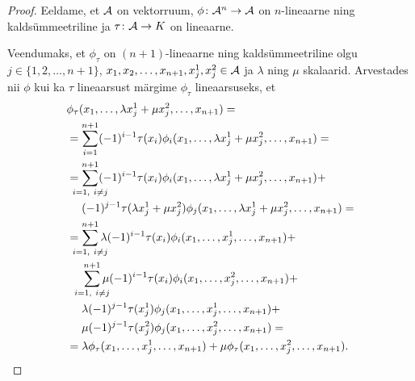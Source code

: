 \begin{proof}
    Eeldame, et $\mathcal{A}$ on vektorruum, $\phi \colon \mathcal{A}^n \to \mathcal{A}$ on
    $n$-lineaarne ning kaldsümmeetriline ja $\tau \colon \mathcal{A} \to K$
    on lineaarne.

    Veendumaks, et $\phi_\tau$ on $(n+1)$-lineaarne ning
    kaldsümmeetriline olgu $j \in \{1, 2, \dots, n+1\}$,
    $x_1, x_2, \dots, x_{n+1}, x_j^1, x_j^2 \in \mathcal{A}$ ja
    $\lambda$ ning $\mu$ skalaarid. Arvestades nii
    $\phi$ kui ka $\tau$ lineaarsust märgime $\phi_\tau$
    lineaarsuseks, et
    \begin{align*}
        &\phi_\tau(
            x_1, \dots, \lambda x_j^1 + \mu x_j^2, \dots, x_{n+1}
        ) = \\
        &= \sum_{i=1}^{n+1} (-1)^{i-1} \tau(x_i) \phi_i(
             x_1, \dots, \lambda x_j^1 + \mu x_j^2, \dots, x_{n+1}
           ) = \\
        &= \sum_{\mathclap{i=1,\ i \ne j}}^{n+1} (-1)^{i-1}
           \tau(x_i) \phi_i(
             x_1, \dots, \lambda x_j^1 + \mu x_j^2, \dots, x_{n+1}
           ) + \\
        &\quad\ (-1)^{j-1} \tau(\lambda x_j^1 + \mu x_j^2)
           \phi_j(
             x_1, \dots, \lambda x_j^1 + \mu x_j^2, \dots, x_{n+1}
           ) = \\
        &= \sum_{\mathclap{i=1,\ i \ne j}}^{n+1}
           \lambda (-1)^{i-1} \tau(x_i) \phi_i(
             x_1, \dots, x_j^1, \dots, x_{n+1}
           ) + \\
        &\quad\ \sum_{\mathclap{i=1,\ i \ne j}}^{n+1} \mu
           (-1)^{i-1} \tau(x_i)
           \phi_i( x_1, \dots, x_j^2, \dots, x_{n+1} ) + \\
        &\quad\ \lambda (-1)^{j-1} \tau(x_j^1) \phi_j(
             x_1, \dots, x_j^1, \dots, x_{n+1}) + \\
        &\quad\ \mu (-1)^{j-1} \tau(x_j^2) \phi_j(
             x_1, \dots, x_j^2, \dots, x_{n+1}) = \\
        &= \lambda \phi_\tau(x_1, \dots, x_j^1, \dots, x_{n+1}) +
           \mu \phi_\tau(x_1, \dots, x_j^2, \dots, x_{n+1}).
    \end{align*}


\end{proof}
